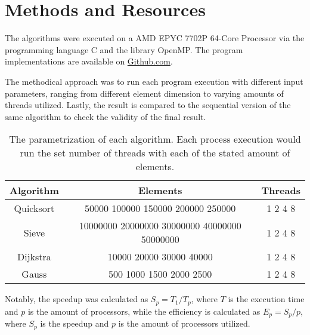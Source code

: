 \chapter{Methods and Resources}

The algorithms were executed on a AMD EPYC 7702P 64-Core Processor 
via the programming language C and the library OpenMP.
The program implementations are available on 
\href{https://github.com/ThompsonA93/C-Slurm-Benchmark}{Github.com}.

The methodical approach was to run each program execution 
with different input parameters, ranging from different element 
dimension to varying amounts of threads utilized.
Lastly, the result is compared to the sequential version of the 
same algorithm to check the validity of the final result.

\begin{table}[H]
    \centering
    \begin{tabular}{|c|c|c|}\hline
        Algorithm & Elements & Threads \\\hline
        Quicksort & 50000 100000 150000 200000 250000 &  1 2 4 8 \\\hline
        Sieve & 10000000 20000000 30000000 40000000 50000000 & 1 2 4 8 \\\hline
        Dijkstra & 10000 20000 30000 40000 & 1 2 4 8 \\\hline
        Gauss & 500 1000 1500 2000 2500 & 1 2 4 8 \\\hline
        
    \end{tabular}
    \caption{The parametrization of each algorithm. Each process execution would run the set number of threads with each of the stated amount of elements.}
    \label{tab:my_label}
\end{table}

Notably, the speedup was calculated as $S_p = T_1 / T_p$, where $T$ is the execution time and $p$ is the amount of processors,
while the efficiency is calculated as $E_p = S_p / p$, where $S_p$ is the speedup and $p$ is the amount of processors utilized.